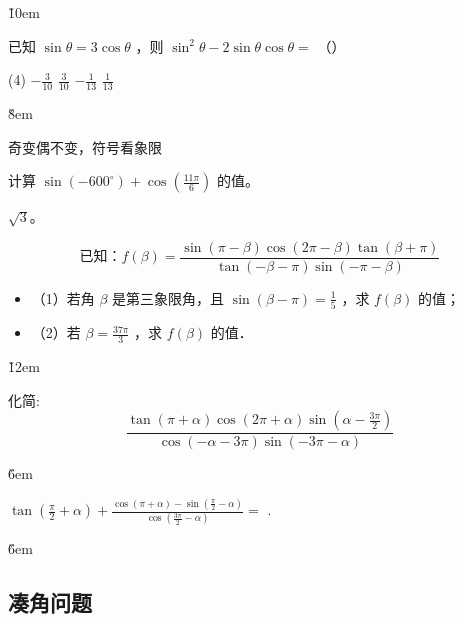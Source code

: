 \v{10em}

\begin{example}
    已知 $\sin \theta=3 \cos \theta$ ，则 $\sin ^2 \theta-2 \sin \theta \cos \theta=$ （\qquad）
    \begin{tasks}(4)
        \task $-\frac{3}{10}$
        \task $\frac{3}{10}$
        \task $-\frac{1}{13}$
        \task $\frac{1}{13}$
    \end{tasks}
\end{example}

\v{8em}

\begin{theorem}[诱导公式]
    奇变偶不变，符号看象限
\end{theorem}

\begin{example}
    计算 $\sin(-600^\circ) + \cos(\frac{11\pi}{6})$ 的值。
\end{example}
\begin{solution}
    $\sqrt{3}$。
\end{solution}
\vspace{2em}

\begin{problem}
$$\text{已知：}f(\beta)=\frac{\sin (\pi-\beta) \cos (2 \pi-\beta) \tan (\beta+\pi)}{\tan (-\beta-\pi) \sin (-\pi-\beta)}$$
\begin{itemize}
    \item （1）若角 $\beta$ 是第三象限角，且 $\sin (\beta-\pi)=\frac{1}{5}$ ，求 $f(\beta)$ 的值；
    \item （2）若 $\beta=\frac{37 \pi}{3}$ ，求 $f(\beta)$ 的值．
\end{itemize}
\end{problem}

\v{12em}

\begin{problem}
化简:
$$
    \frac{\tan (\pi+\alpha) \cos (2 \pi+\alpha) \sin \left(\alpha-\frac{3 \pi}{2}\right)}{\cos (-\alpha-3 \pi) \sin (-3 \pi-\alpha)}
$$
\end{problem}

\v{6em}

\begin{example}
    $\tan \left(\frac{\pi}{2}+\alpha\right)+\frac{\cos (\pi+\alpha)-\sin \left(\frac{\pi}{2}-\alpha\right)}{\cos \left(\frac{3 \pi}{2}-\alpha\right)}=$ \underline{\qquad}.
\end{example}

\v{6em}

\subsection{凑角问题}

